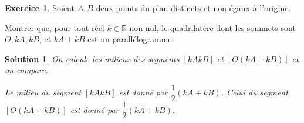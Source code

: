 \documentclass[a4paper, 14pt]{extarticle}
\theoremstyle{plain}
\newtheorem*{sol}{Solution}
\theoremstyle{definition}
\newtheorem{ex}{Exercice}
\newcommand{\R}{\mathbb{R}}
\newcommand{\exe}[2]{
		\begin{ex} #1  \end{ex}
		\begin{sol} #2 \end{sol}
	}
\newcommand{\exe}[2]{
		\begin{ex} #1  \end{ex}
	}
\begin{document}
%

\exe{
	Soient $A, B$ deux points du plan distincts et non égaux à l'origine.
	
	Montrer que, pour tout réel $k \in \R$ non nul, le quadrilatère dont les sommets sont $O, kA, kB$, et $kA + kB$ est un parallélogramme.
}{

	On calcule les milieux des segments $[kAkB]$ et $[O(kA+kB)]$ et on compare.
	
	Le milieu du segment $[kAkB]$ est donné par $\dfrac12(kA + kB)$. 
	Celui du segment $[O(kA+kB)]$ est donné par $\dfrac12(kA+kB)$.

}

%	
%
%
\end{document}
